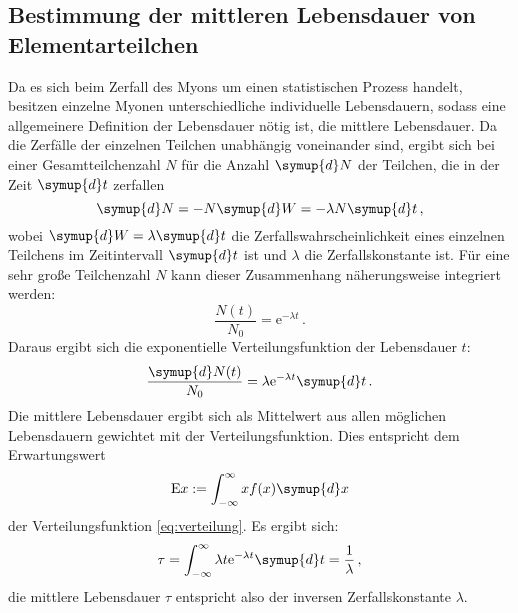 \subsection{Bestimmung der mittleren Lebensdauer von Elementarteilchen}
Da es sich beim Zerfall des Myons um einen statistischen Prozess handelt, besitzen einzelne Myonen unterschiedliche individuelle Lebensdauern,
sodass eine allgemeinere Definition der Lebensdauer nötig ist, die mittlere Lebensdauer. Da die Zerfälle der einzelnen Teilchen unabhängig voneinander sind,
ergibt sich bei einer Gesamtteilchenzahl $N$ für die Anzahl $\symup{d}N$ der Teilchen, die in der Zeit $\symup{d}t$ zerfallen
\begin{equation}
  \symup{d}N = -N\symup{d}W = -\lambda N\symup{d}t \,,
\end{equation}
wobei $\symup{d}W = \lambda\symup{d}t$ die Zerfallswahrscheinlichkeit eines einzelnen Teilchens im Zeitintervall $\symup{d}t$ ist und $\lambda$ die Zerfallskonstante ist.
Für eine sehr große Teilchenzahl $N$ kann dieser Zusammenhang näherungsweise integriert werden:
\begin{equation}
  \frac{N(t)}{N_0} = \text{e}^{-\lambda t} \,.
\end{equation}
Daraus ergibt sich die exponentielle Verteilungsfunktion der Lebensdauer $t$:
\begin{equation}
  \frac{\symup{d}N(t)}{N_0} = \lambda\text{e}^{-\lambda t}\symup{d}t\,.
  \label{eq:verteilung}
\end{equation}
Die mittlere Lebensdauer ergibt sich als Mittelwert aus allen möglichen Lebensdauern gewichtet mit der Verteilungsfunktion. Dies entspricht dem Erwartungswert
\begin{equation}
  \text{E}x := \int_{-\infty}^\infty xf(x)\symup{d}x
\end{equation}
der Verteilungsfunktion \eqref{eq:verteilung}.
Es ergibt sich:
\begin{equation}
  \tau = \int_{-\infty}^\infty \lambda t \text{e}^{-\lambda t} \symup{d}t = \frac{1}{\lambda} \,,
\end{equation}
die mittlere Lebensdauer $\tau$ entspricht also der inversen Zerfallskonstante $\lambda$.
